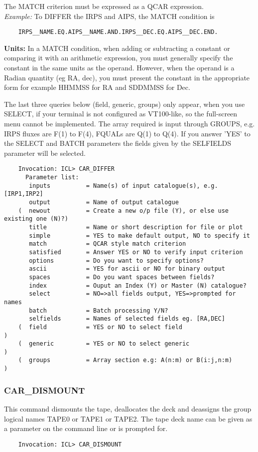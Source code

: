 The MATCH criterion must be expressed as a QCAR expression.\\
{\em Example:}  To DIFFER the IRPS and AIPS, the MATCH condition is
\begin{verbatim}
    IRPS__NAME.EQ.AIPS__NAME.AND.IRPS__DEC.EQ.AIPS__DEC.END.
\end{verbatim}
{\bf Units:} In a MATCH condition, when adding or subtracting a constant or
comparing it with an arithmetic expression, you must generally specify the
constant in the same units as the operand.
However, when the operand is a Radian quantity (eg RA, dec), you must present
the constant in the appropriate form for example HHMMSS for RA
and SDDMMSS for Dec.

The last three queries below (field, generic, groups) only appear, when you use
SELECT, if your terminal is not configured as VT100-like, so the full-screen
menu cannot be implemented.
The array required is input through GROUPS, e.g. IRPS fluxes are F(1) to
F(4), FQUALs are Q(1) to Q(4).
If you answer 'YES' to the SELECT and BATCH parameters the fields given by the
SELFIELDS parameter will be selected.

\begin{verbatim}
    Invocation: ICL> CAR_DIFFER
      Parameter list:
       inputs          = Name(s) of input catalogue(s), e.g. [IRP1,IRP2]
       output          = Name of output catalogue
    (  newout          = Create a new o/p file (Y), or else use existing one (N)?)
       title           = Name or short description for file or plot
       simple          = YES to make default output, NO to specify it
       match           = QCAR style match criterion
       satisfied       = Answer YES or NO to verify input criterion
       options         = Do you want to specify options?
       ascii           = YES for ascii or NO for binary output
       spaces          = Do you want spaces between fields?
       index           = Ouput an Index (Y) or Master (N) catalogue?
       select          = NO=>all fields output, YES=>prompted for names
       batch           = Batch processing Y/N?
       selfields       = Names of selected fields eg. [RA,DEC]
    (  field           = YES or NO to select field                               )
    (  generic         = YES or NO to select generic                             )
    (  groups          = Array section e.g: A(n:m) or B(i:j,n:m)                 )
\end{verbatim}

\subsubsection{CAR\_DISMOUNT}
This command dismounts the tape, deallocates the deck and deassigns
the group logical names TAPE0 or TAPE1 or TAPE2.
The tape deck name can be given as a parameter on the command line or is
prompted for.
\begin{verbatim}
    Invocation: ICL> CAR_DISMOUNT
\end{verbatim}

